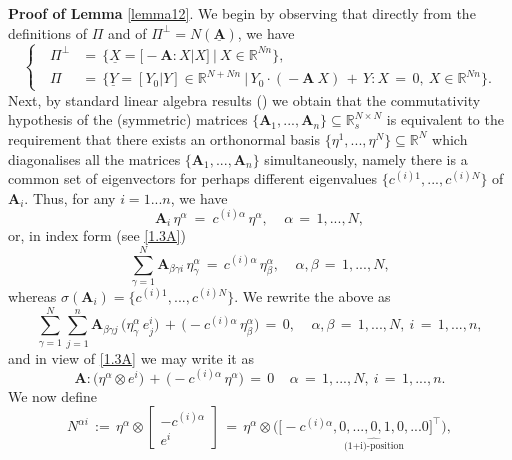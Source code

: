 \documentclass{amsart}
\theoremstyle{definition}
\numberwithin{equation}{section}
\begin{document}
{\medskip \noindent \textbf{Proof of Lemma} } \ref{lemma12}. We begin by observing that directly from the definitions of $\Pi$ and of $\Pi^\bot=N({\underline{\textbf{A}}})$, we have
\begin{equation} \label{3.14}
\left\{\ \ \ 
\begin{split}
\Pi^\bot &=\, \Big\{ \underline{X}=\big[\!-{\textbf{A}}{\!:\!} X \big| X \big] \ \Big| \ X\in {\mathbb{R}}^{Nn} \Big\} ,\\
\Pi\ &=\, \Big\{ \underline{Y}=[Y_0|Y]  \in {\mathbb{R}}^{N+Nn} \ \Big| \, Y_0 \cdot(\!-{\textbf{A}}\:X) \, +\, Y{\!:\!} X\,=\,0,\  X\in {\mathbb{R}}^{Nn} \Big\} .
\end{split}
\right.
\end{equation}
Next, by standard linear algebra results (\cite{L}) we obtain that the commutativity hypothesis of the (symmetric) matrices $\{{\textbf{A}}_1,...,{\textbf{A}}_n\}{\subseteq} {\mathbb{R}}^{N{\times} N}_s$ is equivalent to the requirement that there exists an orthonormal basis $\{\eta^1,...,\eta^N\}{\subseteq} {\mathbb{R}}^N$ which diagonalises all the matrices $\{{\textbf{A}}_1,...,{\textbf{A}}_n\}$ simultaneously, namely there is a common set of eigenvectors for perhaps different eigenvalues $\{c^{(i)1},...,c^{(i)N} \}$ of ${\textbf{A}}_i$. Thus, for any $i=1...n$, we have 
\[
{\textbf{A}}_i \, \eta^{\alpha} \ =\ c^{(i){\alpha}}\, \eta^{\alpha}, \ \ \ \ \ {\alpha}\,=\,1,...,N,
\]
or, in index form (see \eqref{1.3A})
\[
\sum_{{\gamma}=1}^N{\textbf{A}}_{{\beta} {\gamma} i}\, \eta^{\alpha}_{\gamma} \, =\, c^{(i){\alpha} }\, \eta_{\beta}^{\alpha},  \ \ \ \ \ {\alpha},{\beta}\,=\,1,...,N,
\] 
whereas ${\sigma}({\textbf{A}}_i)=\{c^{(i)1},...,c^{(i)N} \}$. We rewrite the above as
\[
\sum_{{\gamma}=1}^N \sum_{j=1}^n{\textbf{A}}_{{\beta} {\gamma} j}\, \big(\eta^{\alpha}_{\gamma} \, e^i_j \big)\, +\, \big(\!-c^{(i){\alpha} }\, \eta_{\beta}^{\alpha}\big)\, =\, 0,  \ \ \ \ \ {\alpha},{\beta}\,=\,1,...,N, \ i\,=\,1,...,n,
\] 
and in view of \eqref{1.3A} we may write it as
\begin{equation} \label{3.15}
{\textbf{A}}{\!:\!} \big(\eta^{\alpha} {\otimes} e^i\big)\, +\, \big(\!-c^{(i){\alpha} }\, \eta^{\alpha}\big)\, =\, 0  \ \ \ \ \ {\alpha}\,=\,1,...,N,\ i\,=\,1,...,n.
\end{equation} 
We now define
\begin{equation} \label{3.16}
N^{{\alpha} i}\, :=\, \eta^{\alpha} {\otimes} 
\left[
\begin{array}{c}
-c^{(i){\alpha}}\\
\hline e^i
\end{array}
\right]\, =\, \eta^{\alpha} {\otimes} \Big( \underset{\quad\quad \ \ \ \ \widehat{\text{(1+i)-position}}}{ \big[-c^{(i){\alpha}},0,...,0,1,0,...0\big]^\top}  \Big),
\end{equation}
\end{document}

